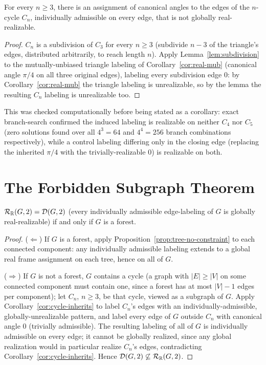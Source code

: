 \begin{corollary}
\label{cor:cycle-inherits}
For every $n\ge3$, there is an assignment of canonical angles to the edges
of the $n$-cycle $C_n$, individually admissible on every edge, that is not
globally real-realizable.
\end{corollary}

\begin{proof}
$C_n$ is a subdivision of $C_3$ for every $n\ge3$ (subdivide $n-3$ of the
triangle's edges, distributed arbitrarily, to reach length $n$). Apply
Lemma~\ref{lem:subdivision} to the mutually-unbiased triangle labeling of
Corollary~\ref{cor:real-mub} (canonical angle $\pi/4$ on all three original
edges), labeling every subdivision edge $0$: by
Corollary~\ref{cor:real-mub} the triangle labeling is unrealizable, so by
the lemma the resulting $C_n$ labeling is unrealizable too.
\end{proof}

This was checked computationally before being stated as a corollary: exact
branch-search confirmed the induced labeling is realizable on
neither $C_4$ nor $C_5$ (zero solutions found over all $4^3=64$ and
$4^4=256$ branch combinations respectively), while a control labeling
differing only in the closing edge (replacing the inherited $\pi/4$ with
the trivially-realizable $0$) is realizable on both.

\section{The Forbidden Subgraph Theorem}

\begin{theorem}[Forbidden subgraph, $d=2$]
\label{thm:forbidden-subgraph}
$\mathcal R_{\mathbb{R}}(G,2) = \mathcal D(G,2)$ (every individually admissible
edge-labeling of $G$ is globally real-realizable) if and only if $G$ is a
forest.
\end{theorem}

\begin{proof}
($\Leftarrow$) If $G$ is a forest, apply
Proposition~\ref{prop:tree-no-constraint} to each connected component: any
individually admissible labeling extends to a global real frame assignment
on each tree, hence on all of $G$.

($\Rightarrow$) If $G$ is not a forest, $G$ contains a cycle (a graph with
$|E|\ge|V|$ on some connected component must contain one, since a forest
has at most $|V|-1$ edges per component); let $C_n$, $n\ge3$, be that
cycle, viewed as a subgraph of $G$. Apply
Corollary~\ref{cor:cycle-inherits} to label $C_n$'s edges with an
individually-admissible, globally-unrealizable pattern, and label every
edge of $G$ outside $C_n$ with canonical angle $0$ (trivially admissible).
The resulting labeling of all of $G$ is individually admissible on every
edge; it cannot be globally realized, since any global realization would
in particular realize $C_n$'s edges, contradicting
Corollary~\ref{cor:cycle-inherits}. Hence $\mathcal D(G,2) \not\subseteq
\mathcal R_{\mathbb{R}}(G,2)$.
\end{proof}

